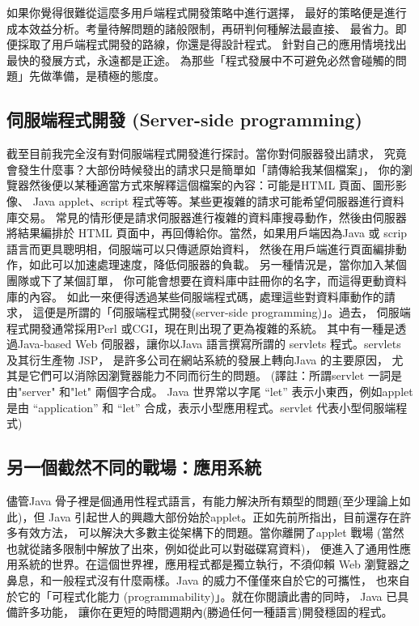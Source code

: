 如果你覺得很難從這麼多用戶端程式開發策略中進行選擇，
最好的策略便是進行成本效益分析。考量待解問題的諸般限制，再研判何種解法最直接、
最省力。即便採取了用戶端程式開發的路線，你還是得設計程式。
針對自己的應用情境找出最快的發展方式，永遠都是正途。
為那些「程式發展中不可避免必然會碰觸的問題」先做準備，是積極的態度。

\subsection{伺服端程式開發 (Server-side programming)}
截至目前我完全沒有對伺服端程式開發進行探討。當你對伺服器發出請求，
究竟會發生什麼事？大部份時候發出的請求只是簡單如「請傳給我某個檔案」，
你的瀏覽器然後便以某種適當方式來解釋這個檔案的內容：可能是HTML 頁面、圖形影像、
Java applet、script 程式等等。某些更複雜的請求可能希望伺服器進行資料庫交易。
常見的情形便是請求伺服器進行複雜的資料庫搜尋動作，然後由伺服器將結果編排於
HTML 頁面中，再回傳給你。當然，如果用戶端因為Java 或
scrip 語言而更具聰明相，伺服端可以只傳遞原始資料，
然後在用戶端進行頁面編排動作，如此可以加速處理速度，降低伺服器的負載。
另一種情況是，當你加入某個團隊或下了某個訂單，
你可能會想要在資料庫中註冊你的名字，而這得更動資料庫的內容。
如此一來便得透過某些伺服端程式碼，處理這些對資料庫動作的請求，
這便是所謂的「伺服端程式開發(server-side programming)」。過去，
伺服端程式開發通常採用Perl 或CGI，現在則出現了更為複雜的系統。
其中有一種是透過Java-based Web 伺服器，讓你以Java 語言撰寫所謂的
servlets 程式。servlets 及其衍生產物 JSP，
是許多公司在網站系統的發展上轉向Java 的主要原因，
尤其是它們可以消除因瀏覽器能力不同而衍生的問題。
(譯註：所謂servlet 一詞是由"server" 和"let" 兩個字合成。
Java 世界常以字尾 ``let'' 表示小東西，例如applet 是由 ``application'' 和 ``let''
合成，表示小型應用程式。servlet 代表小型伺服端程式)


\subsection{另一個截然不同的戰場：應用系統}
儘管Java 骨子裡是個通用性程式語言，有能力解決所有類型的問題(至少理論上如此)，但
Java 引起世人的興趣大部份始於applet。正如先前所指出，目前還存在許多有效方法，
可以解決大多數主從架構下的問題。當你離開了applet 戰場
(當然也就從諸多限制中解放了出來，例如從此可以對磁碟寫資料)，
便進入了通用性應用系統的世界。在這個世界裡，應用程式都是獨立執行，不須仰賴
Web 瀏覽器之鼻息，和一般程式沒有什麼兩樣。Java 的威力不僅僅來自於它的可攜性，
也來自於它的「可程式化能力 (programmability)」。就在你閱讀此書的同時，
Java 已具備許多功能， 讓你在更短的時間週期內(勝過任何一種語言)開發穩固的程式。

